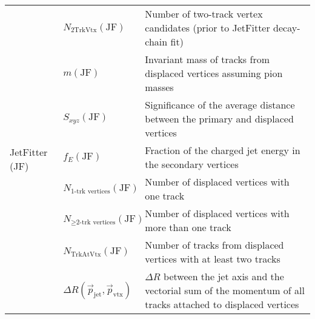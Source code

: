 \begin{table}[!htb]
\begin{scriptsize}
\begin{center}
\begin{tabularx}{\textwidth}{|X|l|X|}
    \hline
    \multirow{8}{*}{JetFitter (JF)} & $N_{\text{2TrkVtx}}(\text{JF})$ & Number of two-track vertex candidates (prior to JetFitter decay-chain fit) \\
    \cline{2-3}
            & $m(\text{JF})$ & Invariant mass of tracks from displaced vertices assuming pion masses \\
    \cline{2-3}
            & $S_{xyz}(\text{JF})$ & Significance of the average distance between the primary and displaced vertices \\
    \cline{2-3}
            & $f_E(\text{JF})$ & Fraction of the charged jet energy in the secondary vertices \\
    \cline{2-3}
            & $N_{\text{1-trk vertices}}(\text{JF})$ & Number of displaced vertices with one track \\
    \cline{2-3}
            & $N_{\ge\text{2-trk vertices}}(\text{JF})$ & Number of displaced vertices with more than one track \\
    \cline{2-3}
            & $N_{\text{TrkAtVtx}}(\text{JF})$ & Number of tracks from displaced vertices with at least two tracks \\
    \cline{2-3}
            & $\Delta R(\vec{p}_{\text{jet}}, \vec{p}_{\text{vtx}})$ & $\Delta R$ between the jet axis and the vectorial sum of the momentum of all tracks attached to displaced vertices \\
    \hline
    \hline
    \end{tabularx}
    \end{center}
    \end{scriptsize}
\end{table}
